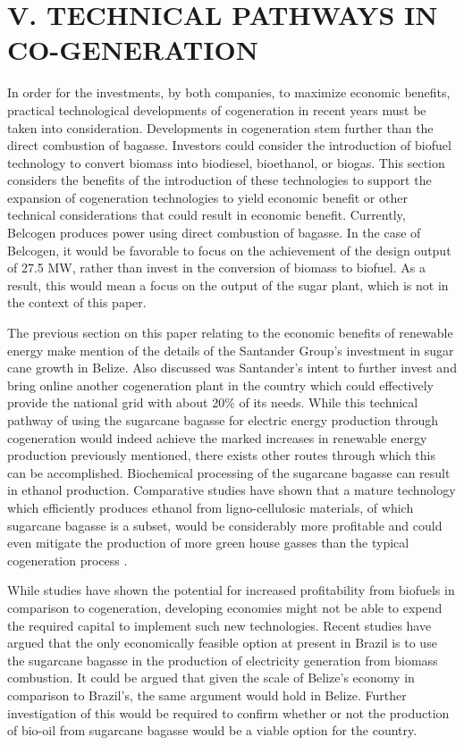 \documentclass[twocolumn,10pt]{asme2e}
\begin{document}
\section*{V. TECHNICAL PATHWAYS IN CO-GENERATION}
In order for the investments, by both companies, to maximize economic benefits, practical technological developments of cogeneration in recent years must be taken into consideration. Developments in cogeneration stem further than the direct combustion of bagasse. Investors could consider the introduction of biofuel technology  to convert biomass into biodiesel, bioethanol, or biogas. This section considers the benefits of the introduction of these technologies to support the expansion of cogeneration technologies to yield economic benefit or other technical considerations that could result in economic benefit.
Currently, Belcogen produces power using direct combustion of bagasse. In the case of Belcogen, it would be favorable to focus on the achievement of the design output of 27.5 MW, rather than invest in the conversion of biomass to biofuel. As a result, this would mean a focus on the output of the sugar plant, which is not in the context of this paper.   

The previous section on this paper relating to the economic benefits of renewable energy make mention of the details of the Santander Group's investment in sugar cane growth in Belize. Also discussed was Santander's intent to further invest and bring online another cogeneration plant in the country which could effectively provide the national grid with about 20\% of its needs. While this technical pathway of using the sugarcane bagasse for electric energy production through cogeneration would indeed achieve the marked increases in renewable energy production previously mentioned, there exists other routes through which this can be accomplished. Biochemical processing of the sugarcane bagasse can result in ethanol production. Comparative studies have shown that a mature technology which efficiently produces ethanol from ligno-cellulosic materials, of which sugarcane bagasse is a subset, would be considerably more profitable and could even mitigate the production of more green house gasses than the typical cogeneration process \cite{biomass_comp}.

While studies have shown the potential for increased profitability from biofuels in comparison to cogeneration, developing economies might not be able to expend the required capital to implement such new technologies. Recent studies have argued that the only economically feasible option at present in Brazil is to use the sugarcane bagasse in the production of electricity generation from biomass combustion\cite{brazil_no}. It could be argued that given the scale of Belize's economy in comparison to Brazil's, the same argument would hold in Belize. Further investigation of this would be required to confirm whether or not the production of bio-oil from sugarcane bagasse would be a viable option for the country. 
\end{document}
